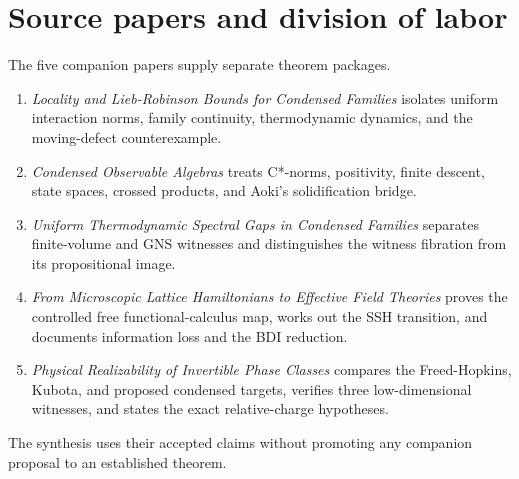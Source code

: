 \documentclass[12pt]{article}
\theoremstyle{definition}
\theoremstyle{remark}
\begin{document}
\section{Source papers and division of labor}

The five companion papers supply separate theorem packages.
\begin{enumerate}[leftmargin=2.2em]
  \item \emph{Locality and Lieb-Robinson Bounds for Condensed Families}
  isolates uniform interaction norms, family continuity, thermodynamic
  dynamics, and the moving-defect counterexample.
  \item \emph{Condensed Observable Algebras} treats C*-norms, positivity,
  finite descent, state spaces, crossed products, and Aoki's solidification
  bridge.
  \item \emph{Uniform Thermodynamic Spectral Gaps in Condensed Families}
  separates finite-volume and GNS witnesses and distinguishes the witness
  fibration from its propositional image.
  \item \emph{From Microscopic Lattice Hamiltonians to Effective Field
  Theories} proves the controlled free functional-calculus map, works out the
  SSH transition, and documents information loss and the BDI reduction.
  \item \emph{Physical Realizability of Invertible Phase Classes} compares
  the Freed-Hopkins, Kubota, and proposed condensed targets, verifies three
  low-dimensional witnesses, and states the exact relative-charge
  hypotheses.
\end{enumerate}

The synthesis uses their accepted claims without promoting any companion
proposal to an established theorem.
\end{document}

